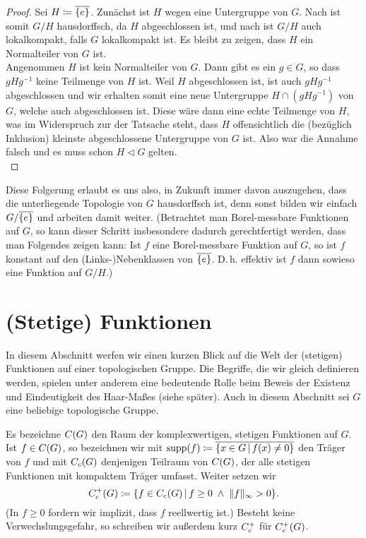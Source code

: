 \begin{proof}
    Sei $H\coloneqq \overline{\{e\}}$. 
    Zunächst ist $H$ wegen  eine Untergruppe von $G$.
    Nach  ist somit $G/H$ hausdorffsch, da $H$
    abgeschlossen ist, und nach  ist $G/H$ auch
    lokalkompakt, falls $G$ lokalkompakt ist. Es bleibt zu zeigen, dass $H$ ein
    Normalteiler von $G$ ist.
    \\
    Angenommen $H$ ist kein Normalteiler von $G$. Dann gibt es ein $g\in G$,
    so dass $gHg^{-1}$ keine Teilmenge von $H$ ist. Weil $H$ abgeschlossen ist,
    ist auch $gHg^{-1}$ abgeschlossen und wir erhalten somit eine neue
    Untergruppe $H \cap (gHg^{-1})$ von $G$, welche auch abgeschlossen ist.
    Diese wäre dann eine echte Teilmenge von $H$, was im Widerspruch zur
    der Tatsache steht, dass $H$ offensichtlich die (bezüglich Inklusion)
    kleinste abgeschlossene Untergruppe von $G$ ist. Also war die Annahme falsch
    und es muss schon $H\triangleleft G$ gelten.
    \\
\end{proof}

Diese Folgerung erlaubt es uns also, in Zukunft immer davon auszugehen, dass die
unterliegende Topologie von $G$ hausdorffsch ist, denn sonst bilden wir einfach
$G/\overline{\{e\}}$ und arbeiten damit weiter. (Betrachtet man Borel-messbare
Funktionen auf $G$, so kann dieser Schritt insbesondere dadurch gerechtfertigt
werden, dass man Folgendes zeigen kann: Ist $f$ eine Borel-messbare Funktion auf
$G$, so ist $f$ konstant auf den (Links-)Nebenklassen von $\overline{\{e\}}$.
D.\,h. effektiv ist $f$ dann sowieso eine Funktion auf $G/H$.)


\section{(Stetige) Funktionen}
In diesem Abschnitt werfen wir einen kurzen Blick auf die Welt der (stetigen)
Funktionen auf einer topologischen Gruppe. Die Begriffe, die wir gleich
definieren werden, spielen unter anderem eine bedeutende Rolle beim Beweis der
Existenz und Eindeutigkeit des Haar-Maßes (siehe später). %
Auch in diesem Abschnitt sei $G$ eine beliebige topologische Gruppe.

\begin{thNotation}
    \label{tg:notation:contcompsupp}
    Es bezeichne $C(G)$ den Raum der komplexwertigen, stetigen
    Funktionen auf $G$. Ist $f\in C(G)$, so bezeichnen wir mit 
    $\supp(f) \defeq \setclosure{ \{ x\in G \Mid f(x) \neq 0 \} }$
    den Träger von $f$ und mit $C_c(G)$ denjenigen Teilraum von
    $C(G)$, der alle stetigen Funktionen mit kompaktem Träger umfasst.
    Weiter setzen wir
    \[ \contcompplus(G) \defeq \{ f\in \contcomp(G) \Mid 
        f \geq 0 \;\wedge\; \supnorm{f} > 0 \}
    . \]
    (In $f\geq 0$ fordern wir implizit, dass $f$ reellwertig ist.)
    Besteht keine Verwechslungsgefahr, so schreiben wir außerdem kurz
    $C_c^+$ für $C_c^+(G)$.
\end{thNotation}

